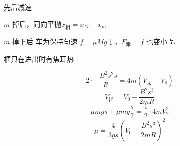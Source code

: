 先后减速

$m$ 掉后，同向平抛$x_{\text{相}}=x_M-x_m$

$m$ 掉下后 车为保持匀速 $f=\mu Mg\downarrow$，$F_{\text{牵}}=f$ 也变小
\textbf{7.}

 \hfill 框只在进出时有焦耳热

\[ 2\cdot\frac{-B^{2}s^{2}s}{R}=4m(V_{\text{末}}-V_0) \] %
\[ V_{\text{出}}=V_0-\frac{B^{2}s^{3}}{2mR} \]
\[ \mu mgs+\mu mg\frac{s}{2}=\frac12\cdot 4mV_2^{2} \]
 \quad {}
\[ \mu=\frac{4}{3gs}\left(V_0-\frac{B^{2}s^{3}}{2mR}\right)^{2} \]
